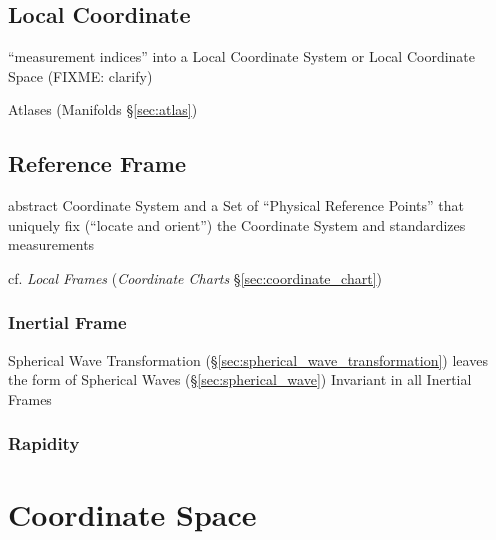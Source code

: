 \subsection{Local Coordinate}\label{sec:local_coordinate}

``measurement indices'' into a Local Coordinate System or Local Coordinate Space
(FIXME: clarify)

\fist Atlases (Manifolds \S\ref{sec:atlas})



\subsection{Reference Frame}\label{sec:reference_frame}

abstract Coordinate System and a Set of ``Physical Reference Points'' that
uniquely fix (``locate and orient'') the Coordinate System and standardizes
measurements

cf. \emph{Local Frames} (\emph{Coordinate Charts} \S\ref{sec:coordinate_chart})



\subsubsection{Inertial Frame}\label{sec:inertial_frame}

Spherical Wave Transformation (\S\ref{sec:spherical_wave_transformation})
leaves the form of Spherical Waves (\S\ref{sec:spherical_wave}) Invariant in
all Inertial Frames



\subsubsection{Rapidity}\label{sec:rapidity}



\section{Coordinate Space}\label{sec:coordinate_space}

